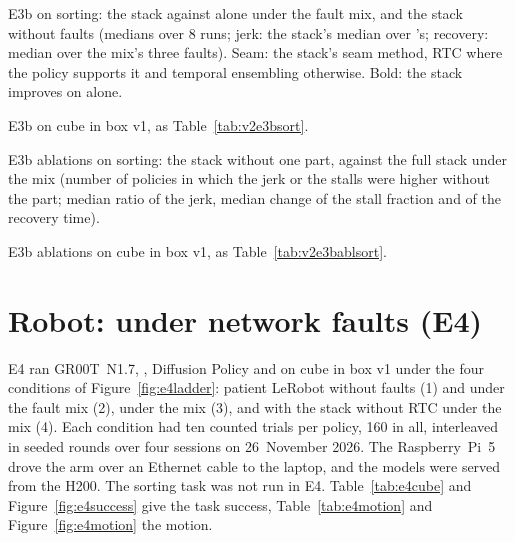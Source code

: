 \begin{table}[htbp]
  \centering
  \small
  \begin{adjustbox}{max width=\textwidth}
  \end{adjustbox}
  \caption{E3b on sorting: the stack against \drtc{} alone under the fault mix, and the stack without faults (medians
           over 8 runs; jerk: the stack's median over \drtc's; recovery: median over the mix's three faults). Seam: the
           stack's seam method, RTC where the policy supports it and temporal ensembling otherwise. Bold: the stack
           improves on \drtc{} alone.}\label{tab:v2e3bsort}
\end{table}

\begin{table}[htbp]
  \centering
  \small
  \begin{adjustbox}{max width=\textwidth}
  \end{adjustbox}
  \caption{E3b on cube in box v1, as Table~\ref{tab:v2e3bsort}.}\label{tab:v2e3bcube}
\end{table}

\begin{table}[htbp]
  \centering
  \small
  \caption{E3b ablations on sorting: the stack without one part, against the full stack under the mix (number of
           policies in which the jerk or the stalls were higher without the part; median ratio of the jerk, median
           change of the stall fraction and of the recovery time).}\label{tab:v2e3bablsort}
\end{table}

\begin{table}[htbp]
  \centering
  \small
  \caption{E3b ablations on cube in box v1, as Table~\ref{tab:v2e3bablsort}.}\label{tab:v2e3bablcube}
\end{table}

\section{Robot: \drtc{} under network faults (E4)}\label{sec:v2robot}

E4 ran GR00T~N1.7, \smolvla, Diffusion Policy and \pizerofive{} on cube in box v1 under the four conditions of
Figure~\ref{fig:e4ladder}: patient LeRobot without faults (1) and under the fault mix (2), \drtc{} under the mix (3),
and \drtc{} with the stack without RTC under the mix (4). Each condition had ten counted trials per policy, 160 in
all, interleaved in seeded rounds over four sessions on 26~November 2026. The Raspberry~Pi~5 drove the arm over an
Ethernet cable to the laptop, and the models were served from the H200. The sorting task was not run in E4.
Table~\ref{tab:e4cube} and Figure~\ref{fig:e4success} give the task success, Table~\ref{tab:e4motion} and
Figure~\ref{fig:e4motion} the motion.

